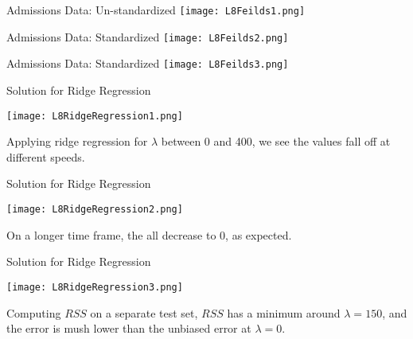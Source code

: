 \documentclass[10pt, table, dvipsnames,xcdraw,handout]{beamer}
\begin{document}
\begin{frame}[fragile]{Admissions Data: Un-standardized}
\centering \texttt{[image: L8Feilds1.png]} 
\end{frame}



\begin{frame}[fragile]{Admissions Data: Standardized}
\centering \texttt{[image: L8Feilds2.png]} 
\end{frame}



\begin{frame}[fragile]{Admissions Data: Standardized}
\centering \texttt{[image: L8Feilds3.png]} 
\end{frame}



\begin{frame}[fragile]{Solution for Ridge Regression} 
  \begin{minipage}[t][0.7\textheight][t]{\textwidth}
	\centering \texttt{[image: L8RidgeRegression1.png]} 
  \end{minipage}
  \vfill
\begin{minipage}[t][0.3\textheight][t]{\textwidth}
Applying ridge regression for $\lambda$ between 0 and 400, we see the values fall off at different speeds.
\end{minipage}

\end{frame}


\begin{frame}[fragile]{Solution for Ridge Regression} 
  \begin{minipage}[t][0.7\textheight][t]{\textwidth}
	\centering \texttt{[image: L8RidgeRegression2.png]} 
  \end{minipage}
  \vfill
\begin{minipage}[t][0.3\textheight][t]{\textwidth}
On a longer time frame, the all decrease to 0, as expected. 
\end{minipage}

\end{frame}


\begin{frame}[fragile]{Solution for Ridge Regression} 
  \begin{minipage}[t][0.7\textheight][t]{\textwidth}
	\centering \texttt{[image: L8RidgeRegression3.png]} 
  \end{minipage}
  \vfill
\begin{minipage}[t][0.3\textheight][t]{\textwidth}
Computing $RSS$ on a separate test set, $RSS$ has a minimum around $\lambda = 150$, and the error is mush lower than the unbiased error at $\lambda=0$. 
\end{minipage}
\end{frame}
\end{document}
